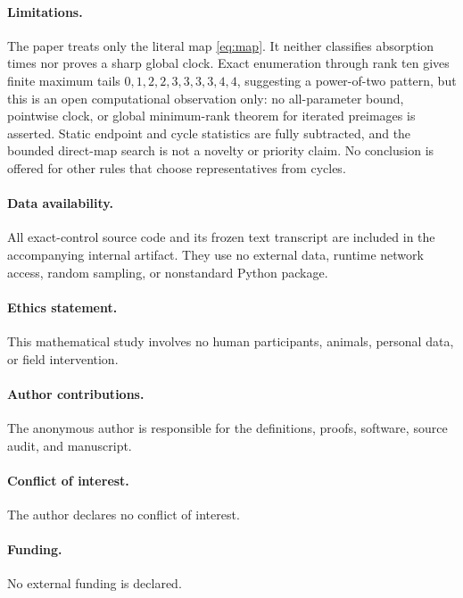 \documentclass[a4paper,10pt]{amsart}
\theoremstyle{remark}
\begin{document}
\paragraph{Limitations.}
The paper treats only the literal map \eqref{eq:map}.  It neither classifies
absorption times nor proves a sharp global clock.  Exact enumeration through
rank ten gives finite maximum tails
\(0,1,2,2,3,3,3,3,4,4\), suggesting a power-of-two pattern, but this is an
open computational observation only: no all-parameter bound, pointwise
clock, or global minimum-rank theorem for iterated preimages is asserted.
Static endpoint and cycle statistics are fully subtracted, and the bounded
direct-map search is not a novelty or priority claim.  No conclusion is
offered for other rules that choose representatives from cycles.

\paragraph{Data availability.}
All exact-control source code and its frozen text transcript are included in
the accompanying internal artifact.  They use no external data, runtime
network access, random sampling, or nonstandard Python package.

\paragraph{Ethics statement.}
This mathematical study involves no human participants, animals, personal
data, or field intervention.

\paragraph{Author contributions.}
The anonymous author is responsible for the definitions, proofs, software,
source audit, and manuscript.

\paragraph{Conflict of interest.}
The author declares no conflict of interest.

\paragraph{Funding.}
No external funding is declared.



\end{document}
